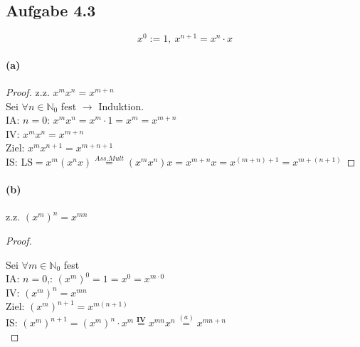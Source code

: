 \newpage

\subsection{Aufgabe 4.3}

\begin{equation*}
x^0:=1,\ x^{n+1}=x^{n}\cdot x
\end{equation*}

\paragraph{(a)}
\begin{proof}
z.z. $x^mx^n=x^{m+n}$\\

Sei $\forall n\in\mathbb{N}_0$ fest $\rightarrow$ Induktion.\\

IA: $n=0$: $x^mx^n=x^m\cdot 1=x^m=x^{m+n}$\\

IV: $x^mx^n=x^{m+n}$\\

Ziel: $x^mx^{n+1}=x^{m+n+1}$\\

IS: LS$=x^m(x^nx)\overset{Ass.Mult}{=}(x^mx^n)x=x^{m+n}x=x^{(m+n)+1}=x^{m+(n+1)}$
\end{proof}

\paragraph{(b)}

z.z. $(x^m)^n=x^{mn}$\\

\begin{proof}
$ $\newline

Sei $\forall m\in\mathbb{N}_0$ fest\\

IA: $n=0$,: $(x^m)^0=1=x^0=x^{m\cdot 0}$\\

IV: $(x^m)^n=x^{mn}$\\

Ziel: $(x^m)^{n+1}=x^{m(n+1)}$\\

IS: $(x^m)^{n+1}=(x^m)^n\cdot x^m\overset{\mathbf{IV}}{=}x^{mn}x^n\overset{(a)}{=}x^{mn+n}$\\
\end{proof}

